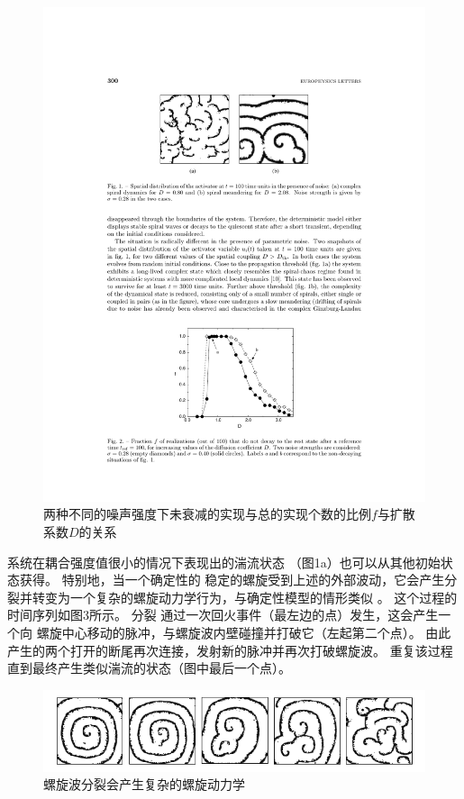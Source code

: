 \documentclass[
pdflinks,
]{xjtuthesis}
\begin{document}
\begin{figure}[!ht]
\centering
\includegraphics[scale=1]{figures/fig2.pdf}
\caption{两种不同的噪声强度下未衰减的实现与总的实现个数的比例$f$与扩散系数$D$的关系}
\end{figure}

\medskip
系统在耦合强度值很⼩的情况下表现出的湍流状态
（图1a）也可以从其他初始状态获得。 特别地，当⼀个确定性的
稳定的螺旋受到上述的外部波动，它会产生分裂并转变为一个复杂的螺旋动⼒学行为，与确定性模型的情形类似
。 这个过程的时间序列如图3所⽰。 分裂
通过一次回⽕事件（最左边的点）发⽣，这会产⽣⼀个向
螺旋中⼼移动的脉冲，与螺旋波内壁碰撞并打破它（左起第⼆个点）。 由此产生的两个打开的断尾再次连接，发射新的脉冲并再次打破螺旋波。
重复该过程直到最终产⽣类似湍流的状态（图中最后⼀个点）。

\begin{figure}[!ht]
\centering
\includegraphics[scale=0.68]{figures/fig3.png}
\caption{螺旋波分裂会产生复杂的螺旋动力学}
\end{figure}
\end{document}
